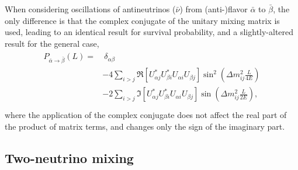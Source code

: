 When considering oscillations of antineutrinos ($\bar{\nu}$)
from (anti-)flavor $\bar{\alpha}$ to $\bar{\beta}$,
the only difference is that the complex conjugate
of the unitary mixing matrix is used,
leading to an identical result for survival probability,
and a slightly-altered result for the general case,
\begin{align}\label{eq:oscprob_general_anti}
    \begin{split}
        P_{\bar{\alpha}\to\bar{\beta}}(L) =
        &\ \delta_{\alpha\beta} \\
        & - 4\sum_{i>j} \Re \left[
            U^*_{\alpha j} U^*_{\beta i} U_{\alpha i} U_{\beta j}
        \right]
        \sin^2\left(\Delta m^2_{ij}\frac{L}{4E}\right) \\
        & - 2\sum_{i>j} \Im \left[
            U^*_{\alpha j} U^*_{\beta i} U_{\alpha i} U_{\beta j}
        \right]
        \sin\left(\Delta m^2_{ij}\frac{L}{2E}\right), \\
    \end{split}
\end{align}
where the application of the complex conjugate does not affect
the real part of the product of matrix terms,
and changes only the sign of the imaginary part.

\subsection{Two-neutrino mixing}

